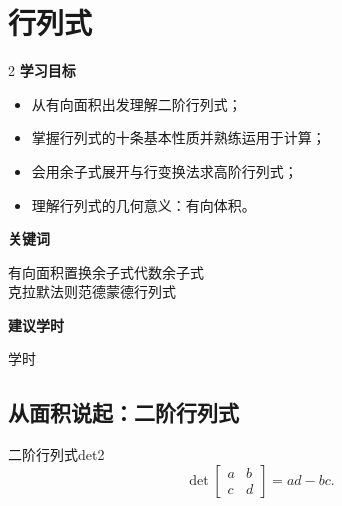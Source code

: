 \documentclass[11pt,a4paper,openany]{ctexbook}
\begin{document}
\chapter{行列式}
\label{ch:det}

\begin{chapoutline}
\small
\begin{multicols}{2}
\textbf{学习目标}
\begin{itemize}[leftmargin=1.5em, itemsep=1.5pt]
\item 从有向面积出发理解二阶行列式；
\item 掌握行列式的十条基本性质并熟练运用于计算；
\item 会用余子式展开与行变换法求高阶行列式；
\item 理解行列式的几何意义：有向体积。
\end{itemize}
\columnbreak
\textbf{关键词}
\par\smallskip
有向面积\quad 置换\quad 余子式\quad 代数余子式\\
克拉默法则\quad 范德蒙德行列式
\par\smallskip
\textbf{建议学时}
\par{} 学时
\end{multicols}
\end{chapoutline}

\section{从面积说起：二阶行列式}

\begin{defn}{二阶行列式}{det2}
\[
\det\begin{bmatrix}a & b\\ c & d\end{bmatrix}=ad-bc.
\]
\end{defn}
\end{document}
